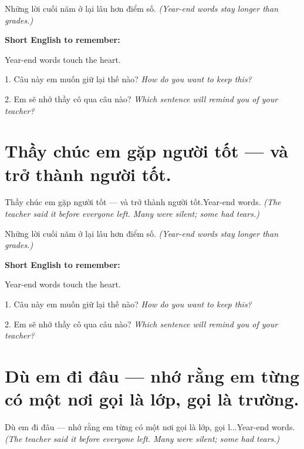 \begin{baihoc}
Những lời cuối năm ở lại lâu hơn điểm số.
\textit{(Year-end words stay longer than grades.)}
\end{baihoc}

\begin{ghinhoanh}
\textbf{Short English to remember:}

Year-end words touch the heart.

\end{ghinhoanh}

\begin{tuhocnhanh}
1. Câu này em muốn giữ lại thế nào? \textit{How do you want to keep this?}

2. Em sẽ nhớ thầy cô qua câu nào? \textit{Which sentence will remind you of your teacher?}
\end{tuhocnhanh}
\ngancach


\section{Thầy chúc em gặp người tốt — và trở thành người tốt.}
\begin{truyen}{Thầy chúc em gặp người tốt — và trở thành người tốt.}{Year-end words.}
\textit{(The teacher said it before everyone left. Many were silent; some had tears.)}
\end{truyen}

\begin{baihoc}
Những lời cuối năm ở lại lâu hơn điểm số.
\textit{(Year-end words stay longer than grades.)}
\end{baihoc}

\begin{ghinhoanh}
\textbf{Short English to remember:}

Year-end words touch the heart.

\end{ghinhoanh}

\begin{tuhocnhanh}
1. Câu này em muốn giữ lại thế nào? \textit{How do you want to keep this?}

2. Em sẽ nhớ thầy cô qua câu nào? \textit{Which sentence will remind you of your teacher?}
\end{tuhocnhanh}
\ngancach


\section{Dù em đi đâu — nhớ rằng em từng có một nơi gọi là lớp, gọi là trường.}
\begin{truyen}{Dù em đi đâu — nhớ rằng em từng có một nơi gọi là lớp, gọi l...}{Year-end words.}
\textit{(The teacher said it before everyone left. Many were silent; some had tears.)}
\end{truyen}

